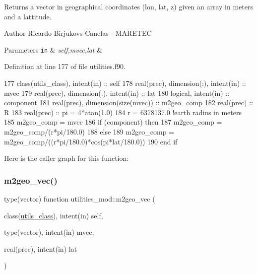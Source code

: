 Returns a vector in geographical coordinates (lon, lat, z) given an array in meters and a lattitude. 

\begin{DoxyAuthor}{Author}
Ricardo Birjukovs Canelas -\/ M\+A\+R\+E\+T\+EC 
\end{DoxyAuthor}

\begin{DoxyParams}[1]{Parameters}
\mbox{\tt in}  & {\em self,mvec,lat} & \\
\hline
\end{DoxyParams}


Definition at line 177 of file utilities.\+f90.


\begin{DoxyCode}
177     \textcolor{keywordtype}{class}(utils\_class), \textcolor{keywordtype}{intent(in)} :: self
178     \textcolor{keywordtype}{real(prec)}, \textcolor{keywordtype}{dimension(:)}, \textcolor{keywordtype}{intent(in)} :: mvec
179     \textcolor{keywordtype}{real(prec)}, \textcolor{keywordtype}{dimension(:)}, \textcolor{keywordtype}{intent(in)} :: lat
180     \textcolor{keywordtype}{logical}, \textcolor{keywordtype}{intent(in)} :: component
181     \textcolor{keywordtype}{real(prec)}, \textcolor{keywordtype}{dimension(size(mvec))} :: m2geo\_comp
182     \textcolor{keywordtype}{real(prec)} :: R
183     \textcolor{keywordtype}{real(prec)} :: pi = 4*atan(1.0)
184     r = 6378137.0 \textcolor{comment}{!earth radius in meters}
185     m2geo\_comp = mvec
186     \textcolor{keywordflow}{if} (component) \textcolor{keywordflow}{then}
187         m2geo\_comp = m2geo\_comp/(r*pi/180.0)
188     \textcolor{keywordflow}{else}
189         m2geo\_comp = m2geo\_comp/((r*pi/180.0)*cos(pi*lat/180.0))
190 \textcolor{keywordflow}{    end if}
\end{DoxyCode}
Here is the caller graph for this function\+:
\mbox{\label{namespaceutilities__mod_a70b21b18c8633b7fd4c3057530d3f16f}} 
\subsubsection{\texorpdfstring{m2geo\+\_\+vec()}{m2geo\_vec()}}
{\footnotesize\ttfamily type(vector) function utilities\+\_\+mod\+::m2geo\+\_\+vec (\begin{DoxyParamCaption}\item[{class(\mbox{\hyperlink{structutilities__mod_1_1utils__class}{utils\+\_\+class}}), intent(in)}]{self,  }\item[{type(vector), intent(in)}]{mvec,  }\item[{real(prec), intent(in)}]{lat }\end{DoxyParamCaption})\hspace{0.3cm}{\ttfamily [private]}}



